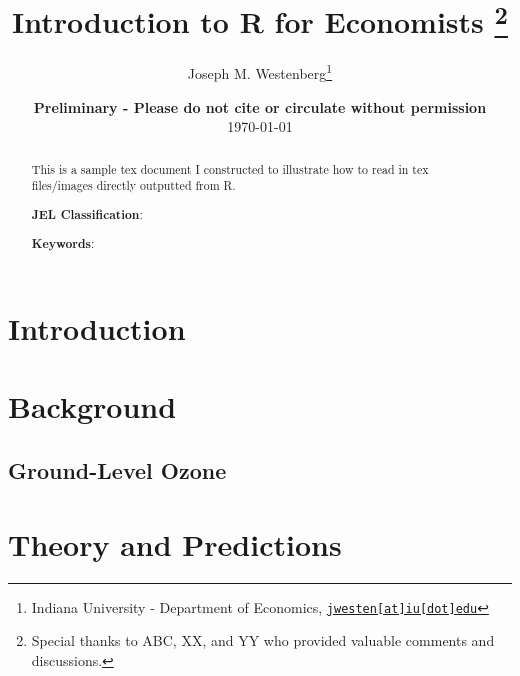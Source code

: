 \documentclass[12pt, letterpaper, leqno]{article}
\begin{document}
\title{\singlespacing Introduction to R for Economists \thanks{Special thanks to ABC, XX, and YY who provided valuable comments and discussions.}
}

\author{
Joseph M. Westenberg\thanks{Indiana University - Department of Economics, \href{mailto:sweiergr@iu.edu} {\nolinkurl{jwesten[at]iu[dot]edu}}}
}

\date{
{\bf Preliminary - Please do not cite or circulate without permission } \\[1ex]
\today}
\clearpage\maketitle
\thispagestyle{empty}
\vspace{-1.5cm}

\begin{abstract}
\vspace{-0.5cm}
{\singlespacing
This is a sample tex document I constructed to illustrate how to read in tex files/images directly outputted from R. 
\vspace{0.4in} \\
\small
{\small
\noindent \textbf{JEL Classification}: 

\noindent \textbf{Keywords}:  
}
}
\end{abstract}
\clearpage
\setcounter{page}{1}


\section{Introduction} %
\label{sec:introduction}



\section{Background}
\subsection{Ground-Level Ozone}
\label{sec:Ground-LevelOzone}




\section{Theory and Predictions}
\label{sec:theory_model}
\end{document}

